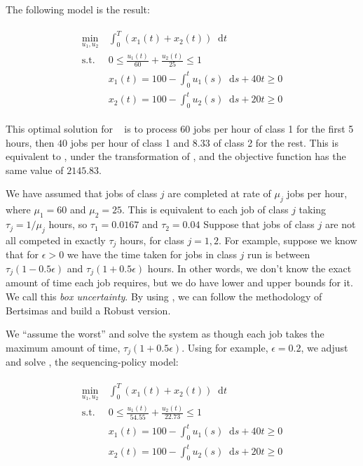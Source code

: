 \documentclass[11pt,a4paper,titlepage]{article}
\newcommand*{\dd}{\ensuremath{\mathop{}\!\mathrm{d}}}%
\theoremstyle{definition}
\theoremstyle{plain}
\begin{document}
    The following model is the result:

    \begin{align}
        \label{eq:model-2}
        \begin{split}
            \min\limits_{u_1, u_2}
            &~ \int_0^T \left( x_1(t) + x_2(t) \right) \dd t \\
            \text{s.t.}
            &~ 0 \leq \frac{u_1(t)}{60} + \frac{u_2(t)}{25} \leq 1 \\
            &~ x_1(t) = 100 - \int_0^t u_1(s) \dd s + 40t \geq 0 \\
            &~ x_2(t) = 100 - \int_0^t u_2(s) \dd s + 20t \geq 0
        \end{split}
    \end{align}

    This optimal solution for \modeltwo ~ is to process $60$ jobs per hour of class 1
    for the first 5 hours,
    then $40$ jobs per hour of class 1 and $8.33$ of class 2 for the rest.
    This is equivalent to \modelone,
    under the transformation of ,
    and the objective function has the same value of $2145.83$.

    We have assumed that jobs of class $j$ are completed at rate of $\mu_j$ jobs per hour,
    where $\mu_1=60$ and $\mu_2=25$.
    This is equivalent to each job of class $j$ taking $\tau_j=1/\mu_j$ hours,
    so $\tau_1=0.0167$ and $\tau_2 = 0.04$
    Suppose that jobs of class $j$ are not all competed in exactly $\tau_j$ hours,
    for class $j=1,2$.
    For example,
    suppose we know that for $\epsilon > 0$
    we have the time taken for jobs in class $j$ run is between
    $\tau_j (1 - 0.5 \epsilon)$
    and
    $\tau_j (1 + 0.5 \epsilon)$
    hours.
    In other words,
    we don't know the exact amount of time each job requires,
    but we do have lower and upper bounds for it.
    We call this \textit{box uncertainty}.
    By using \modeltwo,
    we can follow the methodology of Bertsimas and build a Robust version.

    We ``assume the worst'' and solve the system as though each job takes the maximum amount of time,
    $\tau_j (1+ 0.5 \epsilon)$.
    Using for example,
    $\epsilon=0.2$,
    we adjust and solve \modeltwo,
    the sequencing-policy model:

    \begin{align}
        \label{eq:model-2-robust}
        \begin{split}
            \min\limits_{u_1, u_2}
            &~ \int_0^T \left( x_1(t) + x_2(t) \right) \dd t \\
            \text{s.t.}
            &~ 0 \leq \frac{u_1(t)}{54.55} + \frac{u_2(t)}{22.73} \leq 1 \\
            &~ x_1(t) = 100 - \int_0^t u_1(s) \dd s + 40t \geq 0 \\
            &~ x_2(t) = 100 - \int_0^t u_2(s) \dd s + 20t \geq 0
        \end{split}
    \end{align}
\end{document}
